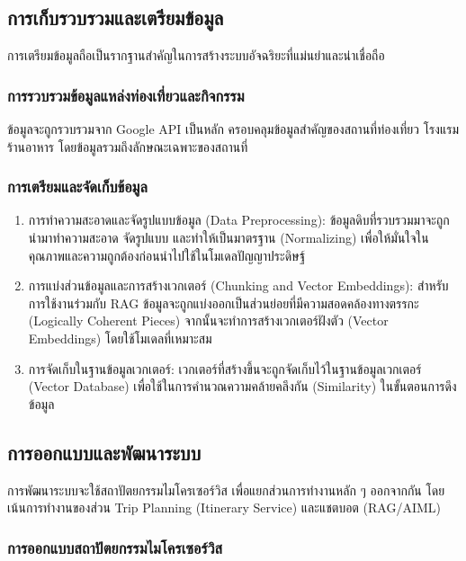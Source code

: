 \subsection{การเก็บรวบรวมและเตรียมข้อมูล}

การเตรียมข้อมูลถือเป็นรากฐานสำคัญในการสร้างระบบอัจฉริยะที่แม่นยำและน่าเชื่อถือ

\subsubsection{การรวบรวมข้อมูลแหล่งท่องเที่ยวและกิจกรรม}

ข้อมูลจะถูกรวบรวมจาก Google API เป็นหลัก ครอบคลุมข้อมูลสำคัญของสถานที่ท่องเที่ยว โรงแรม ร้านอาหาร โดยข้อมูลรวมถึงลักษณะเฉพาะของสถานที่

\subsubsection{การเตรียมและจัดเก็บข้อมูล}

\begin{enumerate}[leftmargin=1.8cm]
\item การทำความสะอาดและจัดรูปแบบข้อมูล (Data Preprocessing): ข้อมูลดิบที่รวบรวมมาจะถูกนำมาทำความสะอาด จัดรูปแบบ และทำให้เป็นมาตรฐาน (Normalizing) เพื่อให้มั่นใจในคุณภาพและความถูกต้องก่อนนำไปใช้ในโมเดลปัญญาประดิษฐ์
\item การแบ่งส่วนข้อมูลและการสร้างเวกเตอร์ (Chunking and Vector Embeddings): สำหรับการใช้งานร่วมกับ RAG ข้อมูลจะถูกแบ่งออกเป็นส่วนย่อยที่มีความสอดคล้องทางตรรกะ (Logically Coherent Pieces) จากนั้นจะทำการสร้างเวกเตอร์ฝังตัว (Vector Embeddings) โดยใช้โมเดลที่เหมาะสม
\item การจัดเก็บในฐานข้อมูลเวกเตอร์: เวกเตอร์ที่สร้างขึ้นจะถูกจัดเก็บไว้ในฐานข้อมูลเวกเตอร์ (Vector Database) เพื่อใช้ในการคำนวณความคล้ายคลึงกัน (Similarity) ในขั้นตอนการดึงข้อมูล
\end{enumerate}

\subsection{การออกแบบและพัฒนาระบบ}

การพัฒนาระบบจะใช้สถาปัตยกรรมไมโครเซอร์วิส เพื่อแยกส่วนการทำงานหลัก ๆ ออกจากกัน โดยเน้นการทำงานของส่วน Trip Planning (Itinerary Service) และแชตบอต (RAG/AIML)

\subsubsection{การออกแบบสถาปัตยกรรมไมโครเซอร์วิส}

